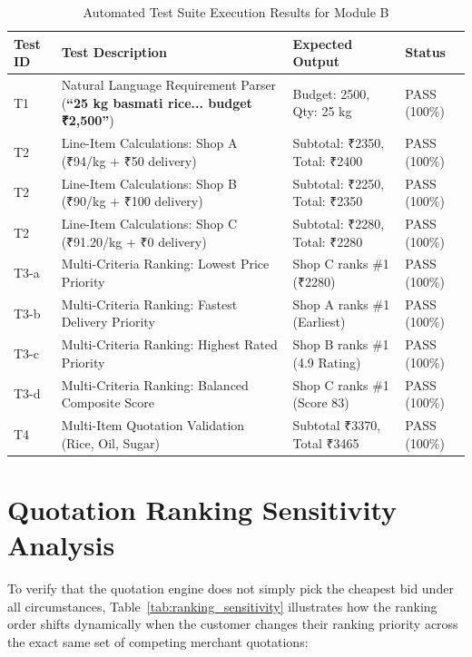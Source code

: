 \begin{table}[H]
\centering
\caption{Automated Test Suite Execution Results for Module B}
\label{tab:rfq_test_results}
\begin{tabular}{p{1.5cm} p{6.5cm} p{2.2cm} p{2.2cm}}
\toprule
\textbf{Test ID} & \textbf{Test Description} & \textbf{Expected Output} & \textbf{Status} \\
\midrule
T1 & Natural Language Requirement Parser (\textbf{``25 kg basmati rice... budget ₹2,500''}) & Budget: 2500, Qty: 25 kg & PASS (100\%) \\
\addlinespace
T2 & Line-Item Calculations: Shop A (₹94/kg + ₹50 delivery) & Subtotal: ₹2350, Total: ₹2400 & PASS (100\%) \\
\addlinespace
T2 & Line-Item Calculations: Shop B (₹90/kg + ₹100 delivery) & Subtotal: ₹2250, Total: ₹2350 & PASS (100\%) \\
\addlinespace
T2 & Line-Item Calculations: Shop C (₹91.20/kg + ₹0 delivery) & Subtotal: ₹2280, Total: ₹2280 & PASS (100\%) \\
\addlinespace
T3-a & Multi-Criteria Ranking: Lowest Price Priority & Shop C ranks \#1 (₹2280) & PASS (100\%) \\
\addlinespace
T3-b & Multi-Criteria Ranking: Fastest Delivery Priority & Shop A ranks \#1 (Earliest) & PASS (100\%) \\
\addlinespace
T3-c & Multi-Criteria Ranking: Highest Rated Priority & Shop B ranks \#1 (4.9 Rating) & PASS (100\%) \\
\addlinespace
T3-d & Multi-Criteria Ranking: Balanced Composite Score & Shop C ranks \#1 (Score 83) & PASS (100\%) \\
\addlinespace
T4 & Multi-Item Quotation Validation (Rice, Oil, Sugar) & Subtotal ₹3370, Total ₹3465 & PASS (100\%) \\
\bottomrule
\end{tabular}
\end{table}

\section{Quotation Ranking Sensitivity Analysis}

To verify that the quotation engine does not simply pick the cheapest bid under all circumstances, Table~\ref{tab:ranking_sensitivity} illustrates how the ranking order shifts dynamically when the customer changes their ranking priority across the exact same set of competing merchant quotations:

